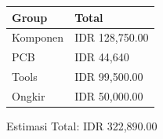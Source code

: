 \documentclass[a4paper,12pt,oneside,pdflatex,italian,final,twocolumn]{article}
\begin{document}
	\begin{table}[!ht]
		\centering
		\begin{tabular}{|l|l|}
			\hline
			Group & Total \\ \hline
			Komponen & IDR 128,750.00 \\ \hline
			PCB & IDR 44,640  \\ \hline
			Tools & IDR 99,500.00 \\ \hline
			Ongkir & IDR 50,000.00 \\ \hline
		\end{tabular}
	\end{table}
	
	Estimasi Total: IDR 322,890.00
	
\end{document}
